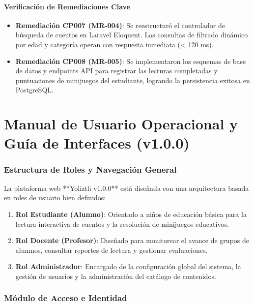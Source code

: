 \documentclass[12pt]{article}
\begin{document}
\subsection{Verificación de Remediaciones Clave}
\begin{itemize}
    \item \textbf{Remediación CP007 (MR-004)}: Se reestructuró el controlador de búsqueda de cuentos en Laravel Eloquent. Las consultas de filtrado dinámico por edad y categoría operan con respuesta inmediata (< 120 ms).
    \item \textbf{Remediación CP008 (MR-005)}: Se implementaron los esquemas de base de datos y endpoints API para registrar las lecturas completadas y puntuaciones de minijuegos del estudiante, logrando la persistencia exitosa en PostgreSQL.
\end{itemize}

\newpage

\part{Manual de Usuario Operacional y Guía de Interfaces (v1.0.0)}

\section{Estructura de Roles y Navegación General}

La plataforma web **Yoliztli v1.0.0** está diseñada con una arquitectura basada en roles de usuario bien definidos:
\begin{enumerate}
    \item \textbf{Rol Estudiante (Alumno)}: Orientado a niños de educación básica para la lectura interactiva de cuentos y la resolución de minijuegos educativos.
    \item \textbf{Rol Docente (Profesor)}: Diseñado para monitorear el avance de grupos de alumnos, consultar reportes de lectura y gestionar evaluaciones.
    \item \textbf{Rol Administrador}: Encargado de la configuración global del sistema, la gestión de usuarios y la administración del catálogo de contenidos.
\end{enumerate}

\section{Módulo de Acceso e Identidad}
\end{document}
